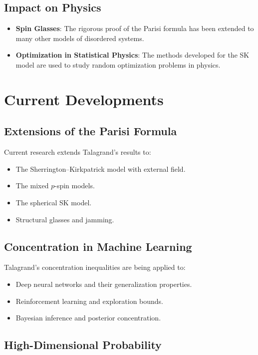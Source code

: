 \subsection{Impact on Physics}

\begin{itemize}
\item \textbf{Spin Glasses}: The rigorous proof of the Parisi formula has been extended to many other models of disordered systems.

\item \textbf{Optimization in Statistical Physics}: The methods developed for the SK model are used to study random optimization problems in physics.
\end{itemize}

\section{Current Developments}

\subsection{Extensions of the Parisi Formula}

Current research extends Talagrand's results to:
\begin{itemize}
\item The Sherrington--Kirkpatrick model with external field.
\item The mixed $p$-spin models.
\item The spherical SK model.
\item Structural glasses and jamming.
\end{itemize}

\subsection{Concentration in Machine Learning}

Talagrand's concentration inequalities are being applied to:
\begin{itemize}
\item Deep neural networks and their generalization properties.
\item Reinforcement learning and exploration bounds.
\item Bayesian inference and posterior concentration.
\end{itemize}

\subsection{High-Dimensional Probability}

